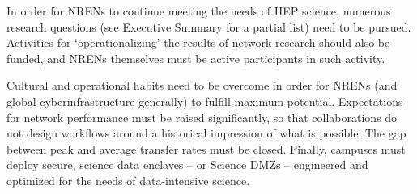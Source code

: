 In order for NRENs to continue meeting the needs of HEP science, numerous research questions (see Executive Summary for a partial list) need to be pursued. Activities for ‘operationalizing’ the results of network research should also be funded, and NRENs themselves must be active participants in such activity. 

Cultural and operational habits need to be overcome in order for NRENs (and global cyberinfrastructure generally) to fulfill maximum potential. 
Expectations for network performance must be raised significantly, so that collaborations do not design workflows around a historical impression of what is possible. The gap between peak and average transfer rates must be closed. 
Finally, campuses must deploy secure, science data enclaves – or  Science DMZs\cite{DMZ} – engineered and optimized for the needs of data-intensive science.    

  




